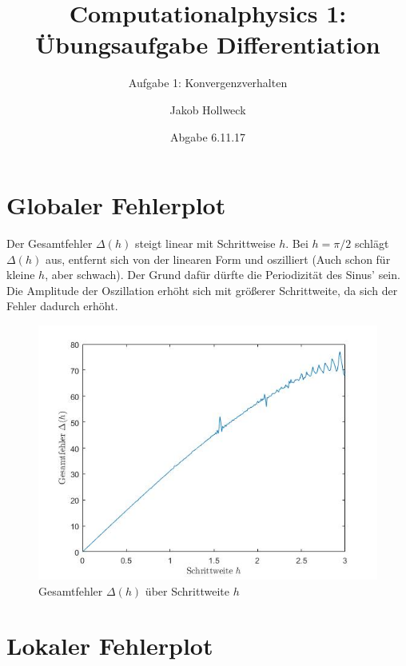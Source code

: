 \documentclass[a4paper, 10pt,onecolumn]{scrartcl}
\title{Computationalphysics 1: Übungsaufgabe Differentiation}
\subtitle{Aufgabe 1: Konvergenzverhalten}
\author{Jakob Hollweck} %
\date{Abgabe 6.11.17}
\begin{document}
\maketitle


\section{Globaler Fehlerplot}

Der Gesamtfehler $\varDelta (h)$ steigt linear mit Schrittweise $h$. Bei $h=\pi/2$ schlägt $\varDelta(h)$ aus, entfernt sich von der linearen Form und oszilliert (Auch schon für kleine $h$, aber schwach). Der Grund dafür dürfte die Periodizität des Sinus' sein. Die Amplitude der Oszillation erhöht sich mit größerer Schrittweite, da sich der Fehler dadurch erhöht. %

\begin{figure}[ht!]
	\centering
	\includegraphics[scale=0.5]{frstplt_latex.jpg}
	\caption{Gesamtfehler $\varDelta(h)$ über Schrittweite $h$} 
\end{figure}


\newpage

\section{Lokaler Fehlerplot}
\end{document}
